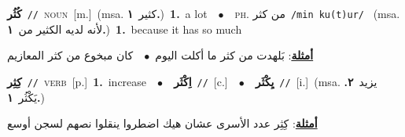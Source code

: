 \documentclass[10pt,a4paper,twoside]{article} %
\begin{document}
\begin{multicols}{2}
{\setlength\topsep{0pt}\textbf{\foreignlanguage{arabic}{كُثُر}}\ {\color{gray}\texttt{//}\color{black}}\ \textsc{noun}\ [m.]\ \color{gray}(msa. \foreignlanguage{arabic}{كثير}~\foreignlanguage{arabic}{\textbf{١.}})\color{black}\ \textbf{1.}~a lot\ \ $\bullet$\ \ \textsc{ph.} \color{gray} \foreignlanguage{arabic}{من كثر}\color{black}\ {\color{gray}\texttt{/{\sffamily min ku(t)ur}/}\color{black}}\ \color{gray} (msa. \foreignlanguage{arabic}{لأنه لديه الكثير من}~\foreignlanguage{arabic}{\textbf{١.}})\color{black}\ \textbf{1.}~because it has so much\  \begin{flushright}\color{gray}\foreignlanguage{arabic}{\textbf{\underline{\foreignlanguage{arabic}{أمثلة}}}: بَلهدت من كثر ما أكلت اليوم\ $\bullet$\ \  كان مبخوع من كثر المعازيم}\end{flushright}\color{black}} \vspace{2mm}

{\setlength\topsep{0pt}\textbf{\foreignlanguage{arabic}{كِثِر}}\ {\color{gray}\texttt{//}\color{black}}\ \textsc{verb}\ [p.]\ \textbf{1.}~increase\ \ $\bullet$\ \ \setlength\topsep{0pt}\textbf{\foreignlanguage{arabic}{اِكْثَر}}\ {\color{gray}\texttt{//}\color{black}}\ [c.]\ \ $\bullet$\ \ \setlength\topsep{0pt}\textbf{\foreignlanguage{arabic}{يِكْثَر}}\ {\color{gray}\texttt{//}\color{black}}\ [i.]\ \color{gray}(msa. \foreignlanguage{arabic}{يزيد}~\foreignlanguage{arabic}{\textbf{٢.}}  \foreignlanguage{arabic}{يَكْثُر}~\foreignlanguage{arabic}{\textbf{١.}})\color{black}\  \begin{flushright}\color{gray}\foreignlanguage{arabic}{\textbf{\underline{\foreignlanguage{arabic}{أمثلة}}}: كِثِر عدد الأسرى عشان هيك اضطروا ينقلوا نصهم لسجن أوسع}\end{flushright}\color{black}} \vspace{2mm}


\end{multicols}
\end{document}

